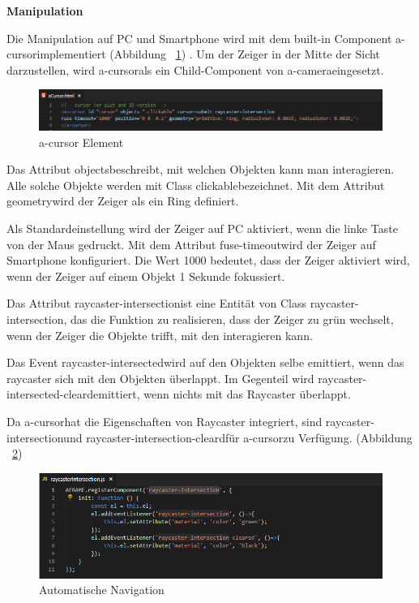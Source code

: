   \textbf{Manipulation}
  
  Die Manipulation auf PC und Smartphone wird mit dem built-in Component \glqq a-cursor\grqq implementiert (Abbildung ~\ref{fig:aCursorElement}) . Um der Zeiger in der Mitte der Sicht darzustellen, wird \glqq a-cursor\grqq als ein Child-Component von \glqq a-camera\grqq eingesetzt.
  
 \begin{figure}[ht]
\vspace*{0.3cm}
\centering
\includegraphics[width=\textwidth]{images/aCursorElement.png}
\caption[a-cursor Element]{a-cursor Element}
\label{fig:aCursorElement} 
\end{figure}
  
  Das Attribut \glqq objects\grqq beschreibt, mit welchen Objekten kann man interagieren. Alle solche Objekte werden mit Class \glqq clickable\grqq bezeichnet. Mit dem Attribut \glqq geometry\grqq wird der Zeiger als ein Ring definiert.
  
  Als Standardeinstellung wird der Zeiger auf PC aktiviert, wenn die linke Taste von der Maus gedruckt. Mit dem Attribut \glqq fuse-timeout\grqq wird der Zeiger auf Smartphone konfiguriert. Die Wert 1000 bedeutet, dass der Zeiger aktiviert wird, wenn der Zeiger auf einem Objekt 1 Sekunde fokussiert.
  
  Das Attribut \glqq raycaster-intersection\grqq ist eine Entität von Class \glqq raycaster-intersection\grqq, das die Funktion zu realisieren, dass der Zeiger zu grün wechselt, wenn der Zeiger die Objekte trifft, mit den interagieren kann.
  
  Das Event \glqq raycaster-intersected\grqq wird auf den Objekten selbe emittiert, wenn das raycaster sich mit den Objekten überlappt. Im Gegenteil wird \glqq raycaster-intersected-cleard\grqq emittiert, wenn nichts mit das Raycaster überlappt.
  
  Da \glqq a-cursor\grqq hat die Eigenschaften von Raycaster integriert, sind \glqq raycaster-intersection\grqq und \glqq raycaster-intersection-cleard\grqq für \glqq a-cursor\grqq zu Verfügung. (Abbildung ~\ref{fig:raycasterIntersection})
  
\begin{figure}[ht]
\vspace*{0.3cm}
\centering
\includegraphics[width=\textwidth]{images/raycasterIntersection.png}
\caption[Automatische Navigation]{Automatische Navigation}
\label{fig:raycasterIntersection} 
\end{figure}
  
